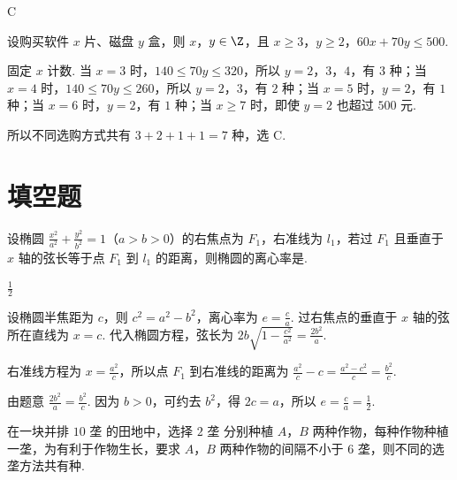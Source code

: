 \begin{answer}
C
\end{answer}

\begin{solution}
设购买软件 \(x\) 片、磁盘 \(y\) 盒，则 \(x\)，\(y\in\Z\)，且
\(x\geqslant3\)，\(y\geqslant2\)，\(60x+70y\leqslant500\).

固定 \(x\) 计数. 当 \(x=3\) 时，\(140\leqslant70y\leqslant320\)，所以 \(y=2\)，\(3\)，\(4\)，有 \(3\) 种；当 \(x=4\) 时，\(140\leqslant70y\leqslant260\)，所以 \(y=2\)，\(3\)，有 \(2\) 种；当 \(x=5\) 时，\(y=2\)，有 \(1\) 种；当 \(x=6\) 时，\(y=2\)，有 \(1\) 种；当 \(x\geqslant7\) 时，即使 \(y=2\) 也超过 \(500\) 元.

所以不同选购方式共有 \(3+2+1+1=7\) 种，选 C.
\end{solution}

\section{填空题}

\begin{problem}
设椭圆 \(\frac{x^2}{a^2}+\frac{y^2}{b^2}=1\)（\(a>b>0\)）的右焦点为 \(F_1\)，右准线为 \(l_1\)，若过 \(F_1\) 且垂直于 \(x\) 轴的弦长等于点 \(F_1\) 到 \(l_1\) 的距离，则椭圆的离心率是\fillinblank{}.
\end{problem}

\begin{answer}
\(\frac{1}{2}\)
\end{answer}

\begin{solution}
设椭圆半焦距为 \(c\)，则 \(c^2=a^2-b^2\)，离心率为 \(e=\frac{c}{a}\). 过右焦点的垂直于 \(x\) 轴的弦所在直线为 \(x=c\). 代入椭圆方程，弦长为
\(2b\sqrt{1-\frac{c^2}{a^2}}=\frac{2b^2}{a}\).

右准线方程为 \(x=\frac{a^2}{c}\)，所以点 \(F_1\) 到右准线的距离为
\(\frac{a^2}{c}-c=\frac{a^2-c^2}{c}=\frac{b^2}{c}\).

由题意 \(\frac{2b^2}{a}=\frac{b^2}{c}\). 因为 \(b>0\)，可约去 \(b^2\)，得 \(2c=a\)，所以 \(e=\frac ca=\frac12\).
\end{solution}

\begin{problem}
在一块并排 \(10\text{ 垄}\) 的田地中，选择 \(2\text{ 垄}\) 分别种植 \(A\)，\(B\) 两种作物，每种作物种植一垄，为有利于作物生长，要求 \(A\)，\(B\) 两种作物的间隔不小于 \(6\text{ 垄}\)，则不同的选垄方法共有\fillinblank{}\(\text{种}\).
\end{problem}

